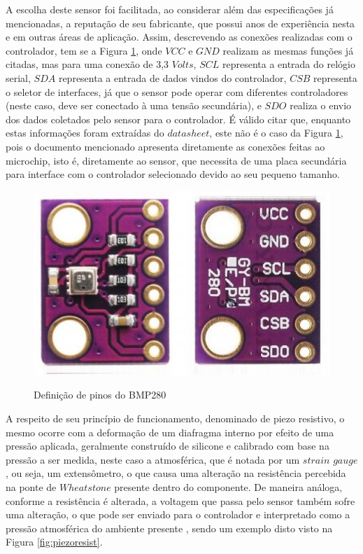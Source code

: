 \documentclass[acronym,symbols]{fei}
\begin{document}
A escolha deste sensor foi facilitada, ao considerar além das especificações já mencionadas, a reputação de seu fabricante, que possui anos de experiência nesta e em outras áreas de aplicação. Assim, descrevendo as conexões realizadas com o controlador, tem se a Figura \ref{fig:PinPress}, onde $VCC$ e $GND$ realizam as mesmas funções já citadas, mas para uma conexão de 3,3 $Volts$, $SCL$ representa a entrada do relógio serial, $SDA$ representa a entrada de dados vindos do controlador, $CSB$ representa o seletor de interfaces, já que o sensor pode operar com diferentes controladores (neste caso, deve ser conectado à uma tensão secundária), e $SDO$ realiza o envio dos dados coletados pelo sensor para o controlador. É válido citar que, enquanto estas informações foram extraídas do $datasheet$, este não é o caso da Figura \ref{fig:PinPress}, pois o documento mencionado apresenta diretamente as conexões feitas ao microchip, isto é, diretamente ao sensor, que necessita de uma placa secundária para interface com o controlador selecionado devido ao seu pequeno tamanho.

\begin{figure}[!htb]
\centering
    \caption{Definição de pinos do BMP280}
    \includegraphics[width=0.8\linewidth]{Imagens/PinPress.png}
    \label{fig:PinPress}
\end{figure}

A respeito de seu princípio de funcionamento, denominado de piezo resistivo, o mesmo ocorre com a deformação de um diafragma interno por efeito de uma pressão aplicada, geralmente construído de silicone e calibrado com base na pressão a ser medida, neste caso a atmosférica, que é notada por um $strain$ $gauge$, ou seja, um extensômetro, o que causa uma alteração na resistência percebida na ponte de $Wheatstone$ presente dentro do componente. De maneira análoga, conforme a resistência é alterada, a voltagem que passa pelo sensor também sofre uma alteração, o que pode ser enviado para o controlador e interpretado como a pressão atmosférica do ambiente presente \cite{piezo}, sendo um exemplo disto visto na Figura \ref{fig:piezoresist}.
\end{document}
